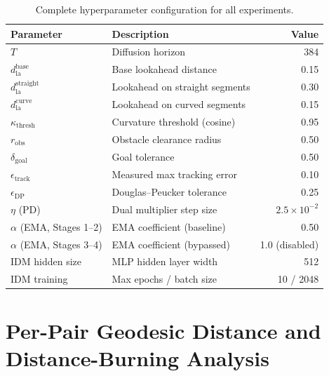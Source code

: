 \documentclass[12pt, a4paper, oneside]{report}
\theoremstyle{definition}
\newcommand{\dlookahead}{d_{\mathrm{la}}}
\begin{document}
\begin{table}[H]
\centering
\caption{Complete hyperparameter configuration for all experiments.}
\label{tab:hyperparams}
\begin{tabular}{@{}llr@{}}
\toprule
\textbf{Parameter} & \textbf{Description} & \textbf{Value} \\
\midrule
$T$                              & Diffusion horizon              & 384    \\
$\dlookahead^{\mathrm{base}}$    & Base lookahead distance        & 0.15   \\
$\dlookahead^{\mathrm{straight}}$& Lookahead on straight segments & 0.30   \\
$\dlookahead^{\mathrm{curve}}$   & Lookahead on curved segments   & 0.15   \\
$\kappa_{\mathrm{thresh}}$       & Curvature threshold (cosine)   & 0.95   \\
$r_{\mathrm{obs}}$               & Obstacle clearance radius      & 0.50   \\
$\delta_{\mathrm{goal}}$         & Goal tolerance                 & 0.50   \\
$\epsilon_{\mathrm{track}}$      & Measured max tracking error    & 0.10   \\
$\epsilon_{\mathrm{DP}}$         & Douglas--Peucker tolerance     & 0.25   \\
$\eta$ (PD)                      & Dual multiplier step size      & $2.5{\times}10^{-2}$ \\
$\alpha$ (EMA, Stages 1--2)      & EMA coefficient (baseline)     & 0.50   \\
$\alpha$ (EMA, Stages 3--4)      & EMA coefficient (bypassed)     & 1.0 (disabled) \\
IDM hidden size                  & MLP hidden layer width         & 512    \\
IDM training                     & Max epochs / batch size        & 10 / 2048 \\
\bottomrule
\end{tabular}
\end{table}

\chapter{Per-Pair Geodesic Distance and Distance-Burning Analysis}
\label{app:pairwise}
\end{document}
